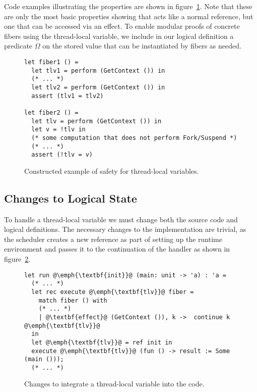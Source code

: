 Code examples illustrating the properties are shown in figure~\ref{fig:tlv-example}.
Note that these are only the most basic properties showing that  acts like a normal reference, but one that can be accessed via an effect.
To enable modular proofs of concrete fibers using the thread-local variable, we include in our logical definition a predicate \(\Omega\) on the stored value that can be instantiated by fibers as needed.

\begin{figure}[ht]
  \begin{verbatim}
let fiber1 () =
  let tlv1 = perform (GetContext ()) in
  (* ... *)
  let tlv2 = perform (GetContext ()) in
  assert (tlv1 = tlv2)

let fiber2 () =
  let tlv = perform (GetContext ()) in
  let v = !tlv in
  (* some computation that does not perform Fork/Suspend *)
  (* ... *)
  assert (!tlv = v)
  \end{verbatim}
  \caption{Constructed example of safety for thread-local variables.}
  \label{fig:tlv-example}
\end{figure}

\subsection{Changes to Logical State}

To handle a thread-local variable we must change both the source code and logical definitions.
The necessary changes to the implementation are trivial, as the scheduler creates a new reference as part of setting up the runtime environment and passes it to the continuation of the \egetctx{} handler as shown in figure~\ref{fig:sched-run-tlv}.
\begin{figure}[H]
  \begin{verbatim}
let run @\emph{\textbf{init}}@ (main: unit -> 'a) : 'a =
  (* ... *)
  let rec execute @\emph{\textbf{tlv}}@ fiber = 
    match fiber () with
    (* ... *)
    | @\textbf{effect}@ (GetContext ()), k ->  continue k @\emph{\textbf{tlv}}@
  in
  let @\emph{\textbf{tlv}}@ = ref init in
  execute @\emph{\textbf{tlv}}@ (fun () -> result := Some (main ())); 
  (* ... *)
  \end{verbatim}
  \caption{Changes to integrate a thread-local variable into the  code.}
  \label{fig:sched-run-tlv}
\end{figure}

